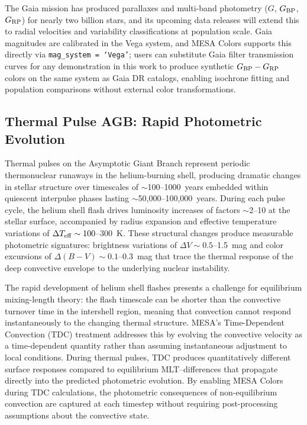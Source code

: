\documentclass[linenumbers,apj,twocolumn, floatfix]{aastex701}
\begin{document}
The Gaia mission \citep{gaia_edr3_2} has produced parallaxes and multi-band photometry ($G$, $G_{\rm BP}$, $G_{\rm RP}$) for nearly two billion stars, and its upcoming data releases will extend this to radial velocities and variability classifications at population scale.
Gaia magnitudes are calibrated in the Vega system, and MESA Colors supports this directly via \texttt{mag\_system = `Vega'}; users can substitute Gaia filter transmission curves for any demonstration in this work to produce synthetic $G_{\rm BP} - G_{\rm RP}$ colors on the same system as Gaia DR catalogs, enabling isochrone fitting and population comparisons without external color transformations.

\subsection{Thermal Pulse AGB: Rapid Photometric Evolution}
\label{sec:demo_tp_agb}

Thermal pulses on the Asymptotic Giant Branch represent periodic thermonuclear runaways in the helium-burning shell, producing dramatic changes in stellar structure over timescales of $\sim$100--1000~years embedded within quiescent interpulse phases lasting $\sim$50,000--100,000~years.
During each pulse cycle, the helium shell flash drives luminosity increases of factors $\sim$2--10 at the stellar surface, accompanied by radius expansion and effective temperature variations of $\Delta T_{\rm eff} \sim 100$--300~K.
These structural changes produce measurable photometric signatures: brightness variations of $\Delta V \sim 0.5$--1.5~mag and color excursions of $\Delta(B-V) \sim 0.1$--0.3~mag that trace the thermal response of the deep convective envelope to the underlying nuclear instability.

The rapid development of helium shell flashes presents a challenge for equilibrium mixing-length theory: the flash timescale can be shorter than the convective turnover time in the intershell region, meaning that convection cannot respond instantaneously to the changing thermal structure.
MESA's Time-Dependent Convection (TDC) treatment \citep{MESAV} addresses this by evolving the convective velocity as a time-dependent quantity rather than assuming instantaneous adjustment to local conditions.
During thermal pulses, TDC produces quantitatively different surface responses compared to equilibrium MLT--differences that propagate directly into the predicted photometric evolution.
By enabling MESA Colors during TDC calculations, the photometric consequences of non-equilibrium convection are captured at each timestep without requiring post-processing assumptions about the convective state.
\end{document}
